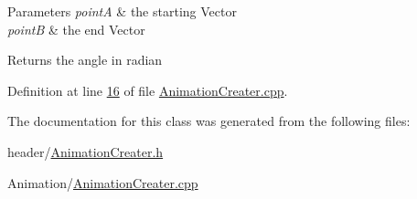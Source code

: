 \begin{DoxyParams}{Parameters}
{\em point\+A} & the starting Vector \\
\hline
{\em point\+B} & the end Vector \\
\hline
\end{DoxyParams}
\begin{DoxyReturn}{Returns}
the angle in radian 
\end{DoxyReturn}


Definition at line \hyperlink{_animation_creater_8cpp_source_l00016}{16} of file \hyperlink{_animation_creater_8cpp_source}{Animation\+Creater.\+cpp}.



The documentation for this class was generated from the following files\+:\begin{DoxyCompactItemize}
\item 
header/\hyperlink{_animation_creater_8h}{Animation\+Creater.\+h}\item 
Animation/\hyperlink{_animation_creater_8cpp}{Animation\+Creater.\+cpp}\end{DoxyCompactItemize}
